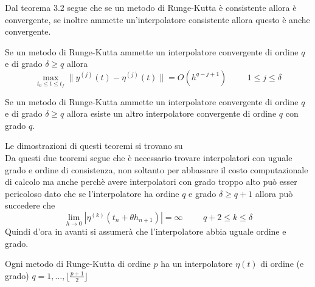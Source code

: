 \begin{oss}
 Dal teorema 3.2 segue che se un metodo di Runge-Kutta è consistente allora è convergente, se inoltre 
 ammette un'interpolatore consistente allora questo è anche convergente.
\end{oss}

\begin{thm}
Se un metodo di Runge-Kutta ammette un interpolatore convergente di ordine 
$q$ e di grado $\delta \geq q$ 
allora 
$$
\max_{t_0 \le t \le t_f} \| y^{(j)}(t) - \eta^{(j)}(t) \| = O(h^{q-j+1})
\hspace{1cm}
1 \le j \le \delta 
$$
\end{thm}

\begin{thm}
Se un metodo di Runge-Kutta ammette un interpolatore convergente di ordine 
$q$ e di grado $\delta \geq q$ allora esiste un altro interpolatore convergente di 
ordine $q$ con grado $q$.
\end{thm}
\par
Le dimostrazioni di questi teoremi si trovano su \cite[teo 5.1.5 e 5.1.6]{2}
\vspace{0.5cm}\\
Da questi due teoremi segue che è necessario trovare interpolatori con uguale grado e ordine di 
consistenza, non soltanto per abbassare il costo computazionale di calcolo ma anche perchè avere 
interpolatori con grado troppo alto può esser pericoloso dato che se l'interpolatore ha 
ordine $q$ e grado $\delta \geq q+1$ allora può succedere che 
$$
\lim_{h \rightarrow 0 } | \eta^{(k)}(t_n + \theta h_{n+1}) | = \infty
\hspace{1cm}
q+2 \le k \le \delta
$$
Quindi d'ora in avanti si assumerà che l'interpolatore abbia uguale ordine e grado.
\begin{thm}
 Ogni metodo di Runge-Kutta di ordine $p$ ha un interpolatore $\eta(t)$ di ordine (e grado) 
$q=1, \dots, \lfloor \frac{p+1}{2} \rfloor$
\end{thm}

